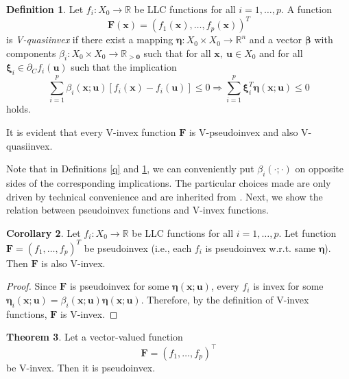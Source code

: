 \documentclass{article}
\theoremstyle{definition}
\newtheorem{maar}{Definition}[section]
\newtheorem{theorem}[maar]{Theorem}
\newtheorem{coro}[maar]{Corollary}
\begin{document}
\begin{maar}{\cite{MisGio}}\label{qq} Let $f_i : X_0 \rightarrow \mathbb R$ be LLC functions for all $i=1,\dots,p$. A function $$\boldsymbol F(\boldsymbol x) = (f_1(\boldsymbol x),\dots,f_p(\boldsymbol x))^T$$ is \emph{V-quasiinvex} if there exist a mapping $\boldsymbol \eta : X_0 \times X_0 \rightarrow \mathbb R^n$ and a vector $\boldsymbol \beta$ with components $\beta_i : X_0 \times X_0 \rightarrow \mathbb R_{> \boldsymbol 0}$ such that for all $\boldsymbol x,\ \boldsymbol u \in X_0$ and for all $\boldsymbol \xi_i \in \partial_C f_i(\boldsymbol u)$ such that the implication
$$\sum_{i=1}^p \beta_i(\boldsymbol x; \boldsymbol u)[f_i(\boldsymbol x) - f_i(\boldsymbol u)] \leq 0 \Longrightarrow \sum_{i=1}^p \boldsymbol \xi_i^T  \boldsymbol \eta(\boldsymbol x; \boldsymbol u) \leq 0$$
holds.

It is evident that every V-invex function $\boldsymbol F$ is V-pseudoinvex and also V-quasiinvex.
\end{maar}

Note that in Definitions \ref{q} and \ref{qq}, we can conveniently put $\beta_i(\boldsymbol\cdot\boldsymbol;\boldsymbol\cdot)$ on opposite sides of the corresponding implications. The particular choices made are only driven by technical convenience and are inherited from \cite{MisGio}.  
Next, we show the relation between pseudoinvex functions and V-invex functions.
\begin{coro}
\label{pseudoisV} Let $f_i : X_0 \rightarrow \mathbb R$ be LLC functions for all $i=1,\dots,p$. Let function $\boldsymbol F = (f_1,\dots,f_p)^T$ be pseudoinvex (i.e., each $f_i$ is pseudoinvex w.r.t. same $\boldsymbol \eta$). Then $\boldsymbol F$ is also V-invex.    
\end{coro}


\begin{proof} Since $\boldsymbol F$ is pseudoinvex for some $\boldsymbol \eta(\boldsymbol x; \boldsymbol u)$, every $f_i$ is invex for some $\boldsymbol \eta_i(\boldsymbol x; \boldsymbol u)=\beta_i(\boldsymbol x; \boldsymbol u)\boldsymbol \eta(\boldsymbol x; \boldsymbol u)$. Therefore, by the definition of V-invex functions, $\boldsymbol F$ is V-invex.
\end{proof}
\begin{theorem}\label{Vispseudo}
Let a vector-valued function 
$$\boldsymbol F = (f_1,\dots,f_p)^\top$$ 
be V-invex. Then it is pseudoinvex.
\end{theorem}
\end{document}
